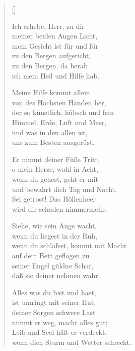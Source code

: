 \begin{multicols}{2}
\settowidth{\versewidth}{wenn dich Sturm und Wetter schreckt.}
\begin{verse}[\versewidth]

 Ich erhebe, Herr, zu dir\\
meiner beiden Augen Licht,\\
mein Gesicht ist für und für\\
zu den Bergen aufgericht,\\
zu den Bergen, da herab\\
ich mein Heil und Hilfe hab.

 Meine Hilfe kommt allein\\
von des Höchsten Händen her,\\
der so künstlich, hübsch und fein\\
Himmel, Erde, Luft und Meer,\\
und was in den allen ist,\\
uns zum Besten ausgerüst.

 Er nimmt deiner Füße Tritt,\\
o mein Herze, wohl in Acht,\\
wenn du gehest, geht er mit\\
und bewahrt dich Tag und Nacht.\\
Sei getrost! Das Höllenheer\\
wird dir schaden nimmermehr.

 Siehe, wie sein Auge wacht,\\
wenn du liegest in der Ruh,\\
wenn du schläfest, kommt mit Macht\\
auf dein Bett geflogen zu\\
seiner Engel güldne Schar,\\
daß sie deiner nehmen wahr.

 Alles was du bist und hast,\\
ist umringt mit seiner Hut,\\
deiner Sorgen schwere Last\\
nimmt er weg, macht alles gut;\\
Leib und Seel hält er verdeckt,\\
wenn dich Sturm und Wetter schreckt.


\end{verse}
\end{multicols}
